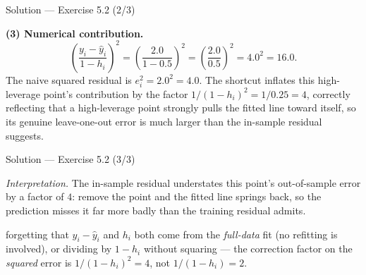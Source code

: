 \documentclass[aspectratio=169,11pt]{beamer}
\begin{document}
\begin{frame}{Solution --- Exercise 5.2 (2/3)}
  \begin{solutionbox}
    \textbf{(3) Numerical contribution.}
    \[
      \left(\frac{y_i - \hat y_i}{1 - h_i}\right)^2
      = \left(\frac{2.0}{1 - 0.5}\right)^2
      = \left(\frac{2.0}{0.5}\right)^2
      = 4.0^2 = 16.0 .
    \]
    The naive squared residual is $e_i^2 = 2.0^2 = 4.0$. The shortcut
    inflates this high-leverage point's contribution by the factor
    $1/(1-h_i)^2 = 1/0.25 = 4$, correctly reflecting that a
    high-leverage point strongly pulls the fitted line toward itself, so
    its genuine leave-one-out error is much larger than the in-sample
    residual suggests.
  \end{solutionbox}
\end{frame}

\begin{frame}{Solution --- Exercise 5.2 (3/3)}
  \begin{solutionbox}
    \emph{Interpretation.} The in-sample residual understates this
    point's out-of-sample error by a factor of $4$: remove the point and
    the fitted line springs back, so the prediction misses it far more
    badly than the training residual admits.
  \end{solutionbox}
  \begin{mistake}
    forgetting that $y_i - \hat y_i$ and $h_i$
    both come from the \emph{full-data} fit (no refitting is involved),
    or dividing by $1-h_i$ without squaring --- the correction factor on
    the \emph{squared} error is $1/(1-h_i)^2 = 4$, not $1/(1-h_i) = 2$.
  \end{mistake}
\end{frame}
\end{document}

